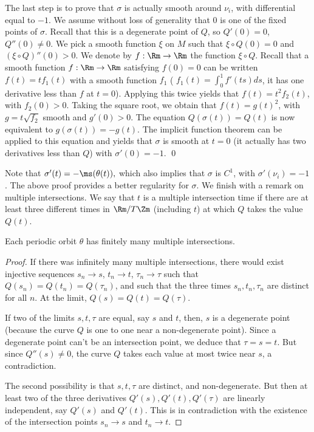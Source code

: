 The last step is to prove that $\sigma$ is actually smooth around $\nu_i$, with differential equal to $-1$. We assume without loss of generality that $0$ is one of the fixed points of $\sigma$. Recall that this is a degenerate point of $Q$, so $Q'(0)=0$, $Q''(0)\neq 0$. We pick a smooth function $\xi$ on $M$ such that $\xi\circ Q(0)=0$ and $(\xi\circ Q)''(0)>0$. We denote by $f:\Rm\to \Rm $ the function $\xi\circ Q$.
Recall that a smooth function $f:\Rm\to \Rm$ satisfying $f(0)=0$ can be written $f(t)=tf_1(t)$ with a smooth function $f_1$ (
$f_1(t)=\int_0^1 f'(ts)ds$, it has one derivative less than $f$ at $t=0$). Applying this twice yields that $f(t)=t^2 f_2(t)$, with $f_2(0)> 0$. Taking the square root, we obtain that $f(t)=g(t)^2$, with $g=t\sqrt{f_2}$ smooth and $g'(0)>0$.
The equation $Q(\sigma(t))=Q(t)$ is now equivalent to $g (\sigma(t))=-g(t)$. The implicit function theorem can be applied to this equation and yields that $\sigma$ is smooth at $t=0$ (it actually has two derivatives less than $Q$) with $\sigma'(0)=-1$.
\qed

\medskip
Note that
$
\sigma'(t)=-\ms(\theta(t)),
$
which also implies that $\sigma$ is $C^1$, with $\sigma'(\nu_i)=-1$. The above proof provides a better regularity for $\sigma$.
We finish with a remark on multiple intersections. We say that $t$ is a multiple intersection time if there are at least three different times in $\Rm/T\Zm$ (including $t$) at which $Q$ takes the value $Q(t)$.

\begin{lem}\label{lem-multi}
Each periodic orbit $\theta$ has finitely many multiple intersections.
\end{lem}

\begin{proof}
If there was infinitely many multiple intersections, there would exist injective sequences $s_n\to s$, $t_n\to t$, $\tau_n \to \tau$
such that $Q(s_n)=Q(t_n)=Q(\tau_n)$, and such that the three times $s_n,t_n,\tau_n$ are distinct for all $n$.
At the limit, $Q(s)=Q(t)=Q(\tau)$.

If two of the limits $s,t,\tau$ are equal, say $s$ and $t$, then, $s$ is a degenerate point (because the curve $Q$ is one to one
near a non-degenerate point). Since a degenerate point can't be an intersection point, we deduce that $\tau=s=t$.
But since $Q''(s)\neq 0$, the curve $Q$ takes each value at most twice near $s$, a contradiction.

The second possibility is that $s, t, \tau$ are distinct, and non-degenerate. But then at least two of the three derivatives
$Q'(s), Q'(t), Q'(\tau)$ are linearly independent, say $Q'(s)$ and $Q'(t)$. This is in contradiction with the existence of the intersection points $s_n\to s$ and $t_n\to t$.
\end{proof}

